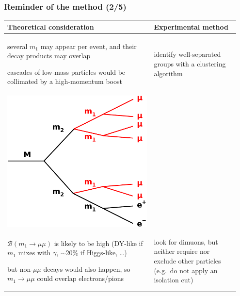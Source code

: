 \documentclass[compress]{beamer}
\begin{document}
\begin{frame}
\frametitle{Reminder of the method (2/5)}

\renewcommand{\arraystretch}{1.7}
\begin{tabular}{p{0.6\linewidth} | p{0.35\linewidth}}
Theoretical consideration & Experimental method \\\hline

several $m_1$ may appear per event, and their decay products may overlap

cascades of low-mass particles would be collimated by a high-momentum boost & identify well-separated groups with a clustering algorithm \\

\centering \includegraphics[width=0.55\linewidth]{basic_picture5.pdf} & \\

$\mathcal{B}(m_1 \to \mu\mu)$ is likely to be high (DY-like if $m_1$ mixes with $\gamma$, $\sim$20\% if Higgs-like, \ldots)

\vspace{0.2 cm}
but non-$\mu\mu$ decays would also happen, so $m_1 \to \mu\mu$ could overlap electrons/pions & look for dimuons, but neither require nor exclude other particles (e.g.\ do not apply an isolation cut) \\
\end{tabular}
\end{frame}
\end{document}
